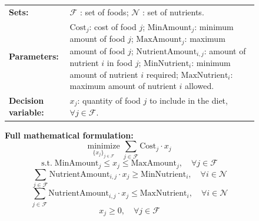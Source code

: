\documentclass[review,12pt]{elsarticle}
\begin{document}
\begin{figure}[htbp]
{{\begin{tcolorbox}
\begin{tcolorbox}[
    width=\linewidth,
    colframe=form, 
    colback=form!6, 
    title={\textbf{Formulation}}, 
    fonttitle=\bfseries,
    halign title=center,
    boxrule=0.6pt,
    arc=2pt,
    left=1mm, right=1mm, top=0.5mm, bottom=0.5mm,
    before skip=0mm, after skip=0.5mm
]
\vspace{-6mm}
\begin{tabularx}{\linewidth}{@{}lX@{}}
\textbf{Sets:} & $\mathcal{F}$ : set of foods; $\mathcal{N}$ : set of nutrients.\\
\textbf{Parameters:} &
$\text{Cost}_j$: cost of food $j$; 
$\text{MinAmount}_j$: minimum amount of food $j$; 
$\text{MaxAmount}_j$: maximum amount of food $j$; 
$\text{NutrientAmount}_{i,j}$: amount of nutrient $i$ in food $j$; 
$\text{MinNutrient}_i$: minimum amount of nutrient $i$ required; 
$\text{MaxNutrient}_i$: maximum amount of nutrient $i$ allowed.\\
\textbf{Decision variable:} &
$x_j$: quantity of food $j$ to include in the diet, $\forall j \in \mathcal{F}$.\\
\end{tabularx}

\noindent\textbf{Full mathematical formulation:}
\vspace{-3mm}
\begin{equation}
\underset{\{x_j\}_{j \in \mathcal{F}}}{\text{minimize}} \;
\sum_{j \in \mathcal{F}} \text{Cost}_j \cdot x_j
\end{equation}
\vspace{-5mm}
\begin{equation}
\text{s.t.} \;
\text{MinAmount}_j \leq x_j \leq \text{MaxAmount}_j, \quad \forall j \in \mathcal{F}
\end{equation}
\vspace{-5mm}
\begin{equation}
\sum_{j \in \mathcal{F}} \text{NutrientAmount}_{i,j} \cdot x_j \geq \text{MinNutrient}_i, \quad \forall i \in \mathcal{N}
\end{equation}
\vspace{-5mm}
\begin{equation}
\sum_{j \in \mathcal{F}} \text{NutrientAmount}_{i,j} \cdot x_j \leq \text{MaxNutrient}_i, \quad \forall i \in \mathcal{N}
\end{equation}
\vspace{-5mm}
\begin{equation}
x_j \geq 0, \quad \forall j \in \mathcal{F}
\end{equation}
\end{tcolorbox}


\end{tcolorbox}}}
\end{figure}
\end{document}
